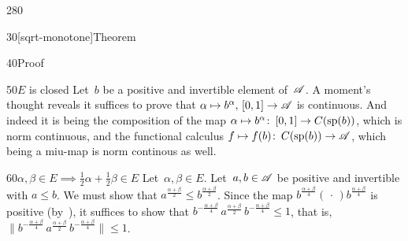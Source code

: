 \begin{parsec}{280}
\begin{point}{30}[sqrt-monotone]{Theorem}
\begin{point}{40}{Proof}
\begin{point}{50}{$E$ is closed}
Let~$b$ be a positive and invertible element of~$\mathscr{A}$.
A moment's thought reveals it suffices to 
prove that $\alpha\mapsto b^\alpha, \,[0,1]\to\mathscr{A}$
is continuous.
And indeed it is
being
the composition of the map $\alpha \mapsto b^\alpha\colon\,[0,1]
\to C(\mathrm{sp}(b))$, 
	which is norm continuous,
and the functional
	calculus $f\mapsto f(b)\colon\,
	C(\mathrm{sp}(b))\to \mathscr{A}$, which being a miu-map is norm continous
	as well.
\end{point}
\begin{point}{60}{$\alpha,\beta\in E\implies \frac{1}{2}\alpha+\frac{1}{2}\beta
	\in E$}
Let~$\alpha,\beta\in E$. Let~$a,b\in\mathscr{A}$ be positive
and invertible with $a\leq b$.
We must show that $a^{\frac{\alpha+\beta}{2}}\leq 
b^{\frac{\alpha+\beta}{2}}$.
Since the map $b^{\frac{\alpha+\beta}{4}}(\,\cdot\,)
b^{\frac{\alpha+\beta}{4}}$
is positive (by~),
it suffices to show that
$b^{-\frac{\alpha+\beta}{4}}\,a^{\frac{\alpha+\beta}{2}}\,
b^{-\frac{\alpha+\beta}{4}} \leq 1$,
that is, 
$\|b^{-\frac{\alpha+\beta}{4}}\,a^{\frac{\alpha+\beta}{2}}\,
b^{-\frac{\alpha+\beta}{4}} \| \leq 1$.


\end{point}
\end{point}
\end{point}
\end{parsec}
